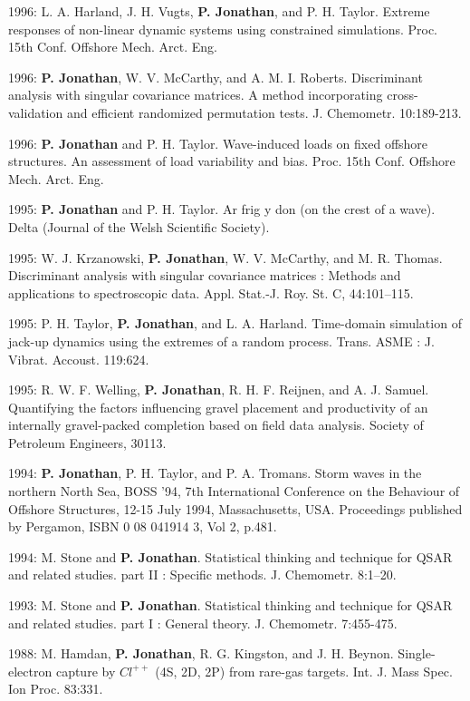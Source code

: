 \documentclass[11pt,a4paper]{moderncv}
\begin{document}
1996: L. A. Harland, J. H. Vugts, \textbf{P. Jonathan}, and P. H. Taylor. Extreme responses of non-linear dynamic systems using constrained simulations. Proc. 15th Conf. Offshore Mech. Arct. Eng.

1996: \textbf{P. Jonathan}, W. V. McCarthy, and A. M. I. Roberts. Discriminant analysis with singular covariance matrices. A method incorporating cross-validation and efficient randomized permutation tests. J. Chemometr. 10:189-213.

1996: \textbf{P. Jonathan} and P. H. Taylor. Wave-induced loads on fixed offshore structures. An assessment of load variability and bias. Proc. 15th Conf. Offshore Mech. Arct. Eng.

1995: \textbf{P. Jonathan} and P. H. Taylor. Ar frig y don (on the crest of a wave). Delta (Journal of the Welsh Scientific Society).

1995: W. J. Krzanowski, \textbf{P. Jonathan}, W. V. McCarthy, and M. R. Thomas. Discriminant analysis with singular covariance matrices : Methods and applications to spectroscopic data. Appl. Stat.-J. Roy. St. C, 44:101--115.

1995: P. H. Taylor, \textbf{P. Jonathan}, and L. A. Harland. Time-domain simulation of jack-up dynamics using the extremes of a random process. Trans. ASME : J. Vibrat. Accoust. 119:624.

1995: R. W. F. Welling, \textbf{P. Jonathan}, R. H. F. Reijnen, and A. J. Samuel. Quantifying the factors influencing gravel placement and productivity of an internally gravel-packed completion based on field data analysis. Society of Petroleum Engineers, 30113.

1994: \textbf{P. Jonathan}, P. H. Taylor, and P. A. Tromans. Storm waves in the northern North Sea, BOSS '94, 7th International Conference on the Behaviour of Offshore Structures, 12-15 July 1994, Massachusetts, USA. Proceedings published by Pergamon, ISBN 0 08 041914 3, Vol 2, p.481.

1994: M. Stone and \textbf{P. Jonathan}. Statistical thinking and technique for QSAR and related studies. part II : Specific methods. J. Chemometr. 8:1--20.

1993: M. Stone and \textbf{P. Jonathan}. Statistical thinking and technique for QSAR and related studies. part I : General theory. J. Chemometr. 7:455-475.

1988: M. Hamdan, \textbf{P. Jonathan}, R. G. Kingston, and J. H. Beynon. Single-electron capture by $Cl^{++}$ (4S, 2D, 2P) from rare-gas targets. Int. J. Mass Spec. Ion Proc. 83:331.
\end{document}
